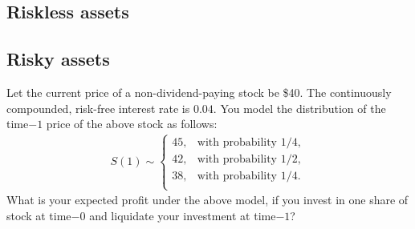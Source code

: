 \documentclass[reqno,letterpaper, onsided,10pt]{amsart}
\newcommand{\ccrfir}{continuously compounded, risk-free interest rate }
\begin{document}
\subsection{Riskless assets}

\begin{example} {\color{purple}{\bf Investing in a zero-coupon bond}}

\end{example}

\vskip8cm

\begin{example} {\color{purple}{\bf Taking a loan}}

\end{example}

\newpage

\subsection{Risky assets}
\begin{example} {\color{purple}{\bf Outright purchase of a stock}}

\end{example}

\vskip8.5cm

\begin{problem} 
Let the current price of a non-dividend-paying stock be \$40. The \ccrfir is $0.04$. You model the distribution of the time$-1$ price of the above stock as follows:
\begin{equation} %
\nonumber
 \begin{split}
   S(1) \sim \begin{cases}
    45, & \text{with probability $1/4$}, \\
        42, & \text{with probability $1/2$}, \\
            38, & \text{with probability $1/4$}. \\
    \end{cases}
 \end{split}
\end{equation}
What is your expected profit under the above model, if you invest in one share of stock at time$-0$ and liquidate your investment at time$-1$?
\end{problem}
\end{document}
